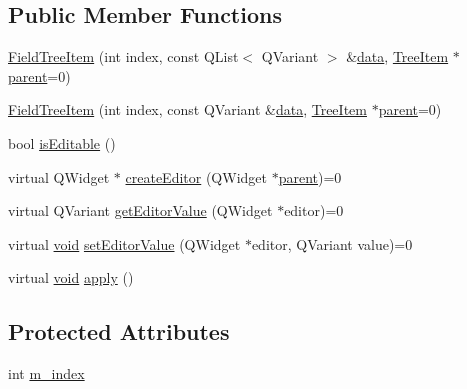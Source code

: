 \subsection*{\-Public \-Member \-Functions}
\begin{DoxyCompactItemize}
\item 
\hyperlink{group___u_a_v_object_browser_plugin_ga9ada7d4ed9c60eb20abec8cfc8e99960}{\-Field\-Tree\-Item} (int index, const \-Q\-List$<$ \-Q\-Variant $>$ \&\hyperlink{group___u_a_v_object_browser_plugin_ga7c5708ae3cbba9c509f497c493beccb6}{data}, \hyperlink{class_tree_item}{\-Tree\-Item} $\ast$\hyperlink{group___u_a_v_object_browser_plugin_gaa3a7ba624312b6be70872634db291881}{parent}=0)
\item 
\hyperlink{group___u_a_v_object_browser_plugin_gab23936d93e6b5a9121347243b8121ddb}{\-Field\-Tree\-Item} (int index, const \-Q\-Variant \&\hyperlink{group___u_a_v_object_browser_plugin_ga7c5708ae3cbba9c509f497c493beccb6}{data}, \hyperlink{class_tree_item}{\-Tree\-Item} $\ast$\hyperlink{group___u_a_v_object_browser_plugin_gaa3a7ba624312b6be70872634db291881}{parent}=0)
\item 
bool \hyperlink{group___u_a_v_object_browser_plugin_ga9451c80f28fd4e9cf1039ccd6c5a578f}{is\-Editable} ()
\item 
virtual \-Q\-Widget $\ast$ \hyperlink{group___u_a_v_object_browser_plugin_ga06084172e5bbdc94cbe4af05faa1402a}{create\-Editor} (\-Q\-Widget $\ast$\hyperlink{group___u_a_v_object_browser_plugin_gaa3a7ba624312b6be70872634db291881}{parent})=0
\item 
virtual \-Q\-Variant \hyperlink{group___u_a_v_object_browser_plugin_ga1807c283f6304e53fc9d655e087ef1c0}{get\-Editor\-Value} (\-Q\-Widget $\ast$editor)=0
\item 
virtual \hyperlink{group___u_a_v_objects_plugin_ga444cf2ff3f0ecbe028adce838d373f5c}{void} \hyperlink{group___u_a_v_object_browser_plugin_gaaa08b0cb3b19768b9dad7281248ce90b}{set\-Editor\-Value} (\-Q\-Widget $\ast$editor, \-Q\-Variant value)=0
\item 
virtual \hyperlink{group___u_a_v_objects_plugin_ga444cf2ff3f0ecbe028adce838d373f5c}{void} \hyperlink{group___u_a_v_object_browser_plugin_gac0c6018349019bfac1859518a7403871}{apply} ()
\end{DoxyCompactItemize}
\subsection*{\-Protected \-Attributes}
\begin{DoxyCompactItemize}
\item 
int \hyperlink{group___u_a_v_object_browser_plugin_gab2e489418a60e96de39035e776c4e1e6}{m\-\_\-index}
\end{DoxyCompactItemize}


